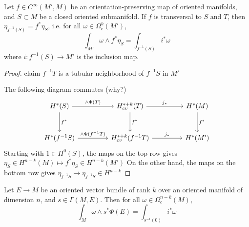\begin{thm} %
	Let $f\in C^\infty(M',M)$ be an orientation-preserving map of oriented
	manifolds, and $S\subset M$ be a closed oriented submanifold. 
	If $f$ is transversal to  $S$ and  $T$, then
	$\eta_{f^{-1}(S)} = f^*\eta_S$, i.e. for all  $\omega\in \Omega^k_c(M')$,
	\[
	\int_{M'} \omega \wedge f^*\eta_S =\int_{f^{-1}(S)} i^*\omega  
	\] 
	where $i: f^{-1}(S) \to M'$ is the inclusion map.
\end{thm}
\begin{proof}
	claim $f^{-1}T$ is a tubular neighborhood of $f^{-1}S$ in $M'$

	The following diagram commutes (why?)
	\[\begin{tikzcd}[row sep=2.85em, column sep=4.45em]
			{H^*(S)} & {H^{*+k}_{cv}(T)} & {H^*(M)} \\
				{H^*(f^{-1}S)} & {H^{*+k}_{cv}(f^{-1}T)} & {H^*(M')}
					\arrow["{f^*}", from=1-1, to=2-1]
						\arrow["{f^*}", from=1-2, to=2-2]
							\arrow["{f^*}", from=1-3, to=2-3]
								\arrow["{\wedge \Phi(T)}", from=1-1, to=1-2]
									\arrow["{j_*}", from=1-2, to=1-3]
										\arrow["{j_*}", from=2-2, to=2-3]
											\arrow["{\wedge \Phi(f^{-1}T)}",
											from=2-1, to=2-2]
	\end{tikzcd}\]
	Starting with $1\in H^0(S)$, the maps on the top row gives 
	$\eta_S \in H^{n-k}(M) \mapsto f^*\eta_S \in H^{n-k}(M')$ 
	On the other hand, the maps on the bottom row gives
	$\eta_{f^{-1}S} \mapsto \eta_{f^{-1}S} \in H^{n-k}$
\end{proof}

\begin{cor} \label{cor:vb_localisation}
	Let $E\to M$ be an oriented vector bundle of rank $k$ over an oriented 
	manifold of dimension $n$, 
	and $s\in\Gamma(M,E)$.
	Then for all $\omega\in \Omega^{n-k}_c(M)$,
	 \[
	\int_M \omega \wedge s^* \Phi(E) =\int_{s^{-1}(0)} i^*\omega  
	\] 
\end{cor}

